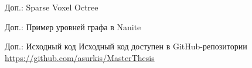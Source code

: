 \begin{frame}{Доп.: Sparse Voxel Octree}
\begin{minipage}{.2\textwidth}
    \end{minipage}
\end{frame}

\begin{frame}{Доп.: Пример уровней графа в Nanite}
    \centering
    
    
    
    
\end{frame}

\begin{frame}{Доп.: Исходный код}
    Исходный код доступен в GitHub-репозитории\\
    \url{https://github.com/asurkis/MasterThesis}

    \bigskip

    \begin{center}
    \end{center}
\end{frame}
